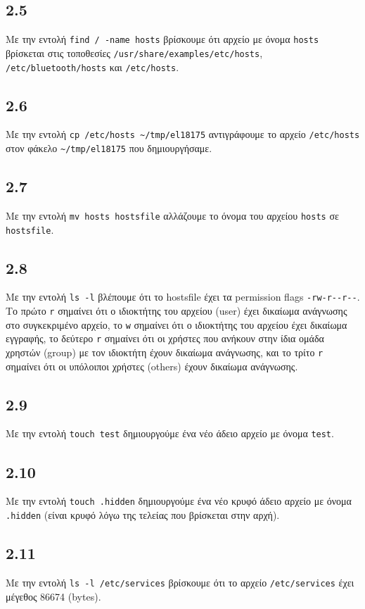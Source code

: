 \documentclass[a4paper, 12pt]{article}
\begin{document}
	\subsection*{2.5}
		Με την εντολή \verb|find / -name hosts| βρίσκουμε ότι αρχείο με όνομα \verb|hosts| βρίσκεται στις τοποθεσίες \verb|/usr/share/examples/etc/hosts|, \verb|/etc/bluetooth/hosts| και \verb|/etc/hosts|.

	\subsection*{2.6}
		Με την εντολή \verb|cp /etc/hosts ~/tmp/el18175| αντιγράφουμε το αρχείο \verb|/etc/hosts| στον φάκελο \verb|~/tmp/el18175| που δημιουργήσαμε.

	\subsection*{2.7}
		Με την εντολή \verb|mv hosts hostsfile| αλλάζουμε το όνομα του αρχείου \verb|hosts| σε \verb|hostsfile|.

	\subsection*{2.8}
		Mε την εντολή \verb|ls -l| βλέπουμε ότι το hostsfile έχει τα permission flags \verb|-rw-r--r--|. Το πρώτο \verb|r| σημαίνει ότι ο ιδιοκτήτης του αρχείου (user) έχει δικαίωμα ανάγνωσης στο συγκεκριμένο αρχείο, το \verb|w| σημαίνει ότι ο ιδιοκτήτης του αρχείου έχει δικαίωμα εγγραφής, το δεύτερο \verb|r| σημαίνει ότι οι χρήστες που ανήκουν στην ίδια ομάδα χρηστών (group) με τον ιδιοκτήτη έχουν δικαίωμα ανάγνωσης, και το τρίτο \verb|r| σημαίνει ότι οι υπόλοιποι χρήστες (others) έχουν δικαίωμα ανάγνωσης. 

	\subsection*{2.9}
		Με την εντολή \verb|touch test| δημιουργούμε ένα νέο άδειο αρχείο με όνομα \verb|test|.

	\subsection*{2.10}
		Με την εντολή \verb|touch .hidden| δημιουργούμε ένα νέο κρυφό άδειο αρχείο με όνομα \verb|.hidden| (είναι κρυφό λόγω της τελείας που βρίσκεται στην αρχή).

	\subsection*{2.11}
		Με την εντολή \verb|ls -l /etc/services| βρίσκουμε ότι το αρχείο \verb|/etc/services| έχει μέγεθος 86674 (bytes).
\end{document}
